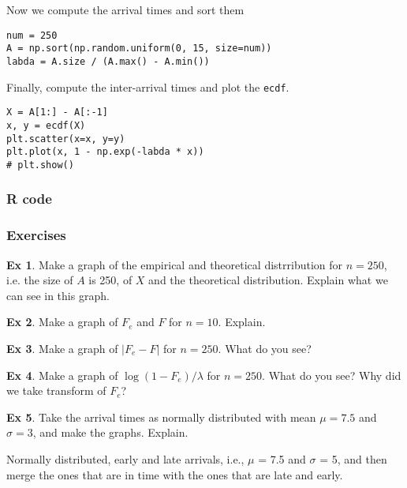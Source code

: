 \documentclass[a4paper]{article}
\theoremstyle{definition}
\newtheorem{exercise}{Ex}[section]
\newcommand{\1}[1]{\,I_{#1}} %
\begin{document}
Now we compute the arrival times and sort them

\begin{verbatim}
num = 250
A = np.sort(np.random.uniform(0, 15, size=num))
labda = A.size / (A.max() - A.min()) 
\end{verbatim}

Finally, compute the inter-arrival times and plot the \texttt{ecdf}.
\begin{verbatim}
X = A[1:] - A[:-1]
x, y = ecdf(X)
plt.scatter(x=x, y=y)
plt.plot(x, 1 - np.exp(-labda * x))
# plt.show()

\end{verbatim}


\subsubsection*{R code}
\label{sec:orgbbfd4db}


\subsubsection{Exercises}
\label{sec:org27b4ea4}
\begin{exercise}
Make a graph of the empirical and theoretical distrribution for $n=250$, i.e. the size of $A$ is 250, of $X$ and the theoretical distribution. Explain what we can see in this graph. 
\end{exercise}

\begin{exercise}
Make a graph of $F_e$ and $F$  for $n=10$. Explain. 
\end{exercise}

\begin{exercise}
Make a graph of  $|F_e - F|$  for $n=250$. What do you see?
\end{exercise}

\begin{exercise}
Make a graph of  $\log(1-F_e)/\lambda$  for $n=250$. What do you see? Why did we take transform of $F_e$?
\end{exercise}


\begin{exercise}
Take the arrival times as normally distributed with mean $\mu=7.5$ and $\sigma=3$, and make the graphs. Explain. 
\end{exercise}

Normally distributed, early and late arrivals, i.e., \(\mu\) = 7.5 and \(\sigma\) = 5, and then merge the ones that are in time with the ones that are late and early. 
\end{document}
